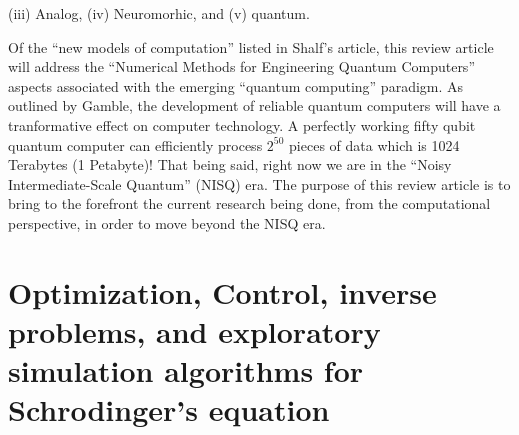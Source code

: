 \documentclass[]{article}
\begin{document}
(iii) Analog, (iv) Neuromorhic, and (v) 
quantum\cite{richard1982feynman,richard1986feynman}.
\par\noindent
Of the ``new models of computation'' listed in 
Shalf's article\cite{shalf2020future}, this review article will address
the ``Numerical Methods for Engineering Quantum Computers'' 
aspects associated with the emerging ``quantum computing'' paradigm.  
As outlined by
Gamble\cite{gamble2019quantum}, the development of reliable quantum
computers will have a tranformative effect on computer technology.  
A perfectly working fifty qubit quantum computer can efficiently 
process $2^{50}$ pieces of data which is 1024 Terabytes (1 Petabyte)!
That being said, right now we are in the 
``Noisy Intermediate-Scale Quantum''\cite{callison2022hybrid} (NISQ) era.  
The purpose of this review article is to bring to the 
forefront the current research being done, from the 
computational perspective, in order to move beyond the NISQ era.


\section{Optimization, Control, inverse
problems, and exploratory simulation algorithms for Schrodinger's equation}
\end{document}
